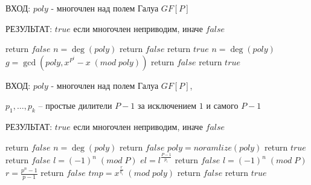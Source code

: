 \documentclass[fleqn,14pt,a5paper]{article}
\begin{document}
\clearpage

\par ВХОД: $poly$ - многочлен над полем Галуа $GF[P]$
\par РЕЗУЛЬТАТ: $true$ если многочлен неприводим, иначе $false$

\begin{algorithmic}[1]

        \State return $false$
    \EndIf
    \State $n = \deg(poly)$
        \State return $false$
    \EndIf
        \State return $true$
    \EndIf
    \State
    \State $n = \deg(poly)$
        \State $g = \gcd\left( poly, x^{P^{i}} - x \; (mod \; poly) \right)$
            \State return $false$
        \EndIf
    \EndFor
    \State return $true$

\end{algorithmic}

\clearpage

\par ВХОД: $poly$ - многочлен над полем Галуа $GF[P]$,
    \par $p_1, \dots, p_k$ – простые дилители $P-1$ за исключением $1$ и самого $P-1$
\par РЕЗУЛЬТАТ: $true$ если многочлен неприводим, иначе $false$

\begin{algorithmic}[1]

        \State return $false$
    \EndIf
    \State $n = \deg(poly)$
        \State return $false$
    \EndIf
    \State
    \State $poly = noramlize(poly)$
        \State return $true$
    \EndIf
        \State return $false$
    \EndIf
    \State
            \State $l = (-1)^n \;(mod \; P)$
            \State $el = l^{\frac{P-1}{p_i}}$
                \State return $false$
            \EndIf
        \EndFor
    \EndIf
    \State
    \State $l = (-1)^n \;(mod \; P)$
    \State $r = \frac{p^n - 1}{p - 1}$
        \State return $false$
    \EndIf
    \State
        \State $tmp = x^{\frac{r}{q_i}} \; (mod \; poly)$
            \State return $false$
        \EndIf
    \EndFor
    \State return $true$

\end{algorithmic}
\end{document}
